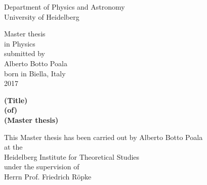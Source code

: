 
\thispagestyle{empty}
\begin{center}
  \renewcommand{\baselinestretch}{2.00}
  \Large\sffamily
  Department of Physics and Astronomy\\
  \large University of Heidelberg
  \par\vfill\normalfont
  Master thesis\\
  in Physics\\
  submitted by\\
  Alberto Botto Poala\\
  born in Biella, Italy\\
  2017
\end{center}
\newpage

\thispagestyle{empty}
\begin{center}
  \renewcommand{\baselinestretch}{2.00}
  \Large\bfseries\sffamily
    (Title)\\
    (of)\\
    (Master thesis)
  \par
  \vfill
  \large\normalfont
  This Master thesis has been carried out by Alberto Botto Poala\\
  at the\\
  Heidelberg Institute for Theoretical Studies\\
  under the supervision of\\
  Herrn Prof. Friedrich R\"{o}pke
\end{center}\par
\vspace{5\baselineskip}

\renewcommand{\baselinestretch}{1.00}\normalsize
